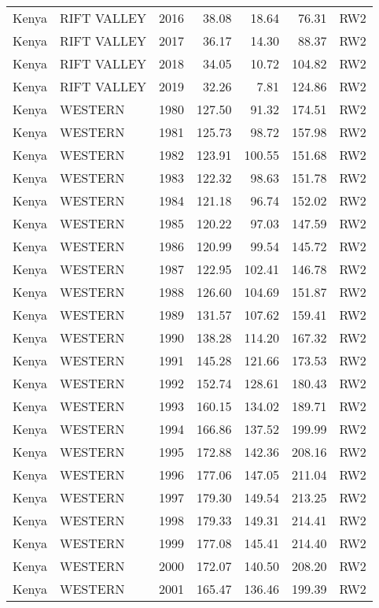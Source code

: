 \begin{longtable}{lllrrrl}
  Kenya & RIFT VALLEY & 2016 & 38.08 & 18.64 & 76.31 & RW2 \\ 
  Kenya & RIFT VALLEY & 2017 & 36.17 & 14.30 & 88.37 & RW2 \\ 
  Kenya & RIFT VALLEY & 2018 & 34.05 & 10.72 & 104.82 & RW2 \\ 
  Kenya & RIFT VALLEY & 2019 & 32.26 & 7.81 & 124.86 & RW2 \\ 
  Kenya & WESTERN & 1980 & 127.50 & 91.32 & 174.51 & RW2 \\ 
  Kenya & WESTERN & 1981 & 125.73 & 98.72 & 157.98 & RW2 \\ 
  Kenya & WESTERN & 1982 & 123.91 & 100.55 & 151.68 & RW2 \\ 
  Kenya & WESTERN & 1983 & 122.32 & 98.63 & 151.78 & RW2 \\ 
  Kenya & WESTERN & 1984 & 121.18 & 96.74 & 152.02 & RW2 \\ 
  Kenya & WESTERN & 1985 & 120.22 & 97.03 & 147.59 & RW2 \\ 
  Kenya & WESTERN & 1986 & 120.99 & 99.54 & 145.72 & RW2 \\ 
  Kenya & WESTERN & 1987 & 122.95 & 102.41 & 146.78 & RW2 \\ 
  Kenya & WESTERN & 1988 & 126.60 & 104.69 & 151.87 & RW2 \\ 
  Kenya & WESTERN & 1989 & 131.57 & 107.62 & 159.41 & RW2 \\ 
  Kenya & WESTERN & 1990 & 138.28 & 114.20 & 167.32 & RW2 \\ 
  Kenya & WESTERN & 1991 & 145.28 & 121.66 & 173.53 & RW2 \\ 
  Kenya & WESTERN & 1992 & 152.74 & 128.61 & 180.43 & RW2 \\ 
  Kenya & WESTERN & 1993 & 160.15 & 134.02 & 189.71 & RW2 \\ 
  Kenya & WESTERN & 1994 & 166.86 & 137.52 & 199.99 & RW2 \\ 
  Kenya & WESTERN & 1995 & 172.88 & 142.36 & 208.16 & RW2 \\ 
  Kenya & WESTERN & 1996 & 177.06 & 147.05 & 211.04 & RW2 \\ 
  Kenya & WESTERN & 1997 & 179.30 & 149.54 & 213.25 & RW2 \\ 
  Kenya & WESTERN & 1998 & 179.33 & 149.31 & 214.41 & RW2 \\ 
  Kenya & WESTERN & 1999 & 177.08 & 145.41 & 214.40 & RW2 \\ 
  Kenya & WESTERN & 2000 & 172.07 & 140.50 & 208.20 & RW2 \\ 
  Kenya & WESTERN & 2001 & 165.47 & 136.46 & 199.39 & RW2 \\ 

\end{longtable}
